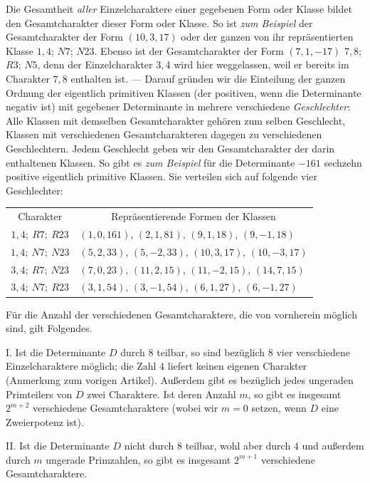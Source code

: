 Die Gesamtheit \textit{aller} Einzelcharaktere einer gegebenen Form oder Klasse bildet den Gesamtcharakter dieser Form oder Klasse. So ist \textit{zum Beispiel} der Gesamtcharakter der Form $(10,3,17)$ oder der ganzen von ihr repräsentierten Klasse $1,4$; $N7$; $N23$. Ebenso ist der Gesamtcharakter der Form $(7,1,-17)$ $7,8$; $R3$; $N5$, denn der Einzelcharakter $3,4$ wird hier weggelassen, weil er bereits im Charakter $7,8$ enthalten ist. --- Darauf gründen wir die Einteilung der ganzen Ordnung der eigentlich primitiven Klassen (der positiven, wenn die Determinante negativ ist) mit gegebener Determinante in mehrere verschiedene \textit{Geschlechter}: Alle Klassen mit demselben Gesamtcharakter gehören zum selben Geschlecht, Klassen mit verschiedenen Gesamtcharakteren dagegen zu verschiedenen Geschlechtern. Jedem Geschlecht geben wir den Gesamtcharakter der darin enthaltenen Klassen. So gibt es \textit{zum Beispiel} für die Determinante $-161$ sechzehn
positive eigentlich primitive Klassen. Sie verteilen sich auf folgende vier Geschlechter:
\begin{center}
\begin{tabular}{c|l}
Charakter & \multicolumn{1}{c}{Repräsentierende Formen der Klassen} \\
$1,4;\ R7;\ R23$ & $(1,0,161)$, $(2,1,81)$, $(9,1,18)$, $(9,-1,18)$ \\
$1,4;\ N7;\ N23$ & $(5,2,33)$, $(5,-2,33)$, $(10,3,17)$, $(10,-3,17)$ \\
$3,4;\ R7;\ N23$ & $(7,0,23)$, $(11,2,15)$, $(11,-2,15)$, $(14,7,15)$ \\
$3,4;\ N7;\ R23$ & $(3,1,54)$, $(3,-1,54)$, $(6,1,27)$, $(6,-1,27)$
\end{tabular}
\end{center}

Für die Anzahl der verschiedenen Gesamtcharaktere, die von vornherein möglich sind, gilt Folgendes.

I. Ist die Determinante $D$ durch $8$ teilbar, so sind bezüglich $8$ vier verschiedene Einzelcharaktere möglich; die Zahl $4$ liefert keinen eigenen Charakter (Anmerkung zum vorigen Artikel). Außerdem gibt es bezüglich jedes ungeraden Primteilers von $D$ zwei Charaktere. Ist deren Anzahl $m$, so gibt es insgesamt $2^{m+2}$ verschiedene Gesamtcharaktere (wobei wir $m=0$ setzen, wenn $D$ eine Zweierpotenz ist).

II. Ist die Determinante $D$ nicht durch $8$ teilbar, wohl aber durch $4$ und außerdem durch $m$ ungerade Primzahlen, so gibt es insgesamt $2^{m+1}$ verschiedene Gesamtcharaktere.

